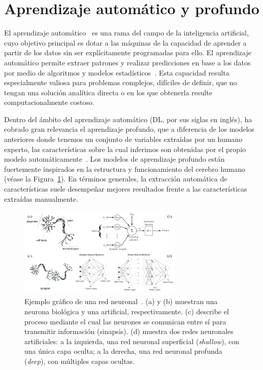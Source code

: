 \section{Aprendizaje automático y profundo}
El aprendizaje automático~\cite{IAModernApproach} es una rama del campo de la inteligencia artificial,
cuyo objetivo principal es dotar a las máquinas de la capacidad de aprender a partir de los datos sin ser explícitamente
programadas para ello. El aprendizaje automático permite extraer patrones y realizar predicciones en base a los datos por
medio de algoritmos y modelos estadísticos~\cite{LearningFromData}. Esta capacidad resulta especialmente valiosa para
problemas complejos, difíciles de definir, que no tengan una solución analítica directa o en los que obtenerla resulte computacionalmente costoso.
\par
Dentro del ámbito del aprendizaje automático (DL, por sus siglas en inglés), ha cobrado gran relevancia el aprendizaje profundo,
que a diferencia de los modelos anteriores donde tenemos un conjunto de variables
extraídas por un humano experto, las características sobre la cual inferimos
son obtenidas por el propio modelo automáticamente~\cite{DeepLMITPress, DeepLearningNature, DeepLearningInNN}.
Los modelos de aprendizaje profundo están fuertemente inspirados en la estructura y funcionamiento del cerebro humano (véase la Figura~\ref{fig:ANNVisualization}).
En términos generales, la extracción automática de características suele
desempeñar mejores resultados frente a las características extraídas manualmente.
\par
\begin{figure}[htp]
  \centering
  \includegraphics[width=0.7\textwidth]{imagenes/chapter2/ANNVisualization.png}
  \caption[Ejemplo gráfico de una red neuronal.]
  {Ejemplo gráfico de una red neuronal~\cite{NeuronImages, NeuronSimilarity,ShallowAndDeepNN}.
    (a) y (b) muestran una neurona biológica y una artificial, respectivamente.
    (c) describe el proceso mediante el cual las neurones se comunican entre sí para transmitir información (sinapsis).
    (d) muestra dos redes neuronales artificiales:
    a la izquierda, una red neuronal superficial (\emph{shallow}), con una única
    capa oculta; a la derecha, una red neuronal profunda (\emph{deep}), con múltiples capas ocultas.
  }
  \label{fig:ANNVisualization}
\end{figure}
